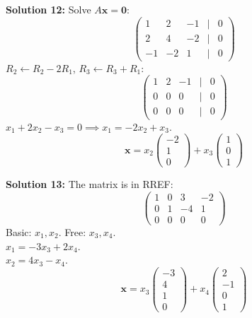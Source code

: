 \documentclass{article}
\begin{document}
\textbf{Solution 12:}
Solve $A\mathbf{x} = \mathbf{0}$:
$$\begin{pmatrix} 1 & 2 & -1 & | & 0 \\ 2 & 4 & -2 & | & 0 \\ -1 & -2 & 1 & | & 0 \end{pmatrix}$$
$R_2 \leftarrow R_2 - 2R_1$, $R_3 \leftarrow R_3 + R_1$:
$$\begin{pmatrix} 1 & 2 & -1 & | & 0 \\ 0 & 0 & 0 & | & 0 \\ 0 & 0 & 0 & | & 0 \end{pmatrix}$$
$x_1 + 2x_2 - x_3 = 0 \implies x_1 = -2x_2 + x_3$. \\
$$\mathbf{x} = x_2 \begin{pmatrix} -2 \\ 1 \\ 0 \end{pmatrix} + x_3 \begin{pmatrix} 1 \\ 0 \\ 1 \end{pmatrix}$$

\textbf{Solution 13:}
The matrix is in RREF:
$$\begin{pmatrix} 1 & 0 & 3 & -2 \\ 0 & 1 & -4 & 1 \\ 0 & 0 & 0 & 0 \end{pmatrix}$$
Basic: $x_1, x_2$. Free: $x_3, x_4$. \\
$x_1 = -3x_3 + 2x_4$. \\
$x_2 = 4x_3 - x_4$. \\
$$\mathbf{x} = x_3 \begin{pmatrix} -3 \\ 4 \\ 1 \\ 0 \end{pmatrix} + x_4 \begin{pmatrix} 2 \\ -1 \\ 0 \\ 1 \end{pmatrix}$$
\end{document}
